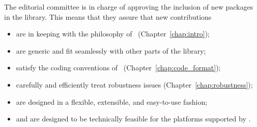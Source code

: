 



The editorial committee is in charge of approving the inclusion of new packages
in the library.  This means that they assure that new contributions
\begin{itemize}
   \item are in keeping with the philosophy of \cgal\ (Chapter~\ref{chap:intro});
   \item are generic and fit seamlessly with other parts of the library;
   \item satisfy the coding conventions of \cgal\ (Chapter~\ref{chap:code_format});
   \item carefully and efficiently treat robustness issues
         (Chapter~\ref{chap:robustness});
   \item are designed in a flexible, extensible, and easy-to-use fashion;
   \item and are designed to be technically feasible for the platforms
         supported by \cgal.
\end{itemize}

